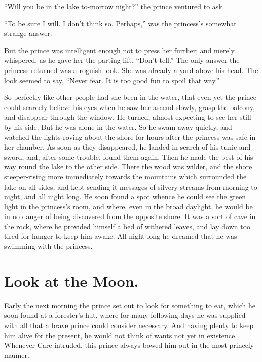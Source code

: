 \documentclass[12pt]{memoir}
\begin{document}
``Will you be in the lake to-morrow night?'' the prince ventured to
ask.

``To be sure I will.  I don't think so.  Perhaps,'' was the princess's
somewhat strange answer.

But the prince was intelligent enough not to press her further; and
merely whispered, as he gave her the parting lift, ``Don't tell.''
The only answer the princess returned was a roguish look.  She was
already a yard above his head.  The look seemed to say, ``Never fear.
It is too good fun to spoil that way.''

So perfectly like other people had she been in the water, that even
yet the prince could scarcely believe his eyes when he saw her ascend
slowly, grasp the balcony, and disappear through the window.  He
turned, almost expecting to see her still by his side.  But he was
alone in the water.  So he swam away quietly, and watched the lights
roving about the shore for hours after the princess was safe in her
chamber.  As soon as they disappeared, he landed in search of his
tunic and sword, and, after some trouble, found them again.  Then he
made the best of his way round the lake to the other side.  There the
wood was wilder, and the shore steeper-rising more immediately towards
the mountains which surrounded the lake on all sides, and kept sending
it messages of silvery streams from morning to night, and all night
long.  He soon found a spot whence he could see the green light in the
princess's room, and where, even in the broad daylight, he would be in
no danger of being discovered from the opposite shore.  It was a sort
of cave in the rock, where he provided himself a bed of withered
leaves, and lay down too tired for hunger to keep him awake.  All
night long he dreamed that he was swimming with the princess.



\chapter{Look at the Moon.}


Early the next morning the prince set out to look for something to
eat, which he soon found at a forester's hut, where for many following
days he was supplied with all that a brave prince could consider
necessary.  And having plenty to keep him alive for the present, he
would not think of wants not yet in existence.  Whenever Care
intruded, this prince always bowed him out in the most princely
manner.
\end{document}
